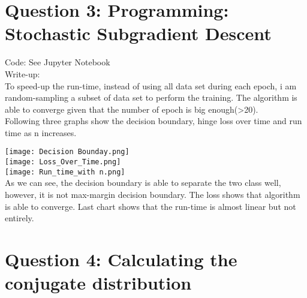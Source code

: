 \documentclass{article}
\begin{document}
\section{Question 3: Programming: Stochastic Subgradient Descent}
Code: See Jupyter Notebook \\
Write-up: \\

To speed-up the run-time, instead of using all data set during each epoch, i am random-sampling a subset of data set to perform the training. The algorithm is able to converge given that the number of epoch is big enough(>20). \\

Following three graphs show the decision boundary, hinge loss over time and run time as n increases.  

\texttt{[image: Decision Bounday.png]} \\
\texttt{[image: Loss\_Over\_Time.png]} \\
\texttt{[image: Run\_time\_with n.png]} \\

As we can see, the decision boundary is able to separate the two class well, however, it is not max-margin decision boundary. The loss shows that algorithm is able to converge. Last chart shows that the run-time is almost linear but not entirely. 

\section{Question 4: Calculating the conjugate distribution}
\end{document}
